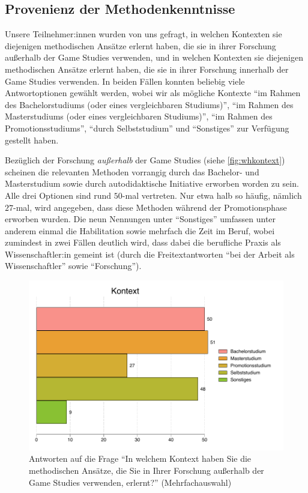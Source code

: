\documentclass{scrartcl}
\begin{document}
\subsection{Provenienz der Methodenkenntnisse}\label{sec:resultate_provenienz}
Unsere Teilnehmer:innen wurden von uns gefragt, in welchen Kontexten sie diejenigen methodischen Ansätze erlernt haben, die sie in ihrer Forschung außerhalb der Game Studies verwenden, und in welchen Kontexten sie diejenigen methodischen Ansätze erlernt haben, die sie in ihrer Forschung innerhalb der Game Studies verwenden.
In beiden Fällen konnten beliebig viele Antwortoptionen gewählt werden, wobei wir als mögliche Kontexte \enquote{im Rahmen des Bachelorstudiums (oder eines vergleichbaren Studiums)}, \enquote{im Rahmen des Masterstudiums (oder eines vergleichbaren Studiums)}, \enquote{im Rahmen des Promotionsstudiums}, \enquote{durch Selbststudium} und \enquote{Sonstiges} zur Verfügung gestellt haben.

Bezüglich der Forschung \textit{außerhalb} der Game Studies (siehe \autoref{fig:whkontext}) scheinen die relevanten Methoden vorrangig durch das Bachelor- und Masterstudium sowie durch autodidaktische Initiative erworben worden zu sein.
Alle drei Optionen sind rund $50$-mal vertreten.
Nur etwa halb so häufig, nämlich $27$-mal, wird angegeben, dass diese Methoden während der Promotionsphase erworben wurden.
Die neun Nennungen unter \enquote{Sonstiges} umfassen unter anderem einmal die Habilitation sowie mehrfach die Zeit im Beruf, wobei zumindest in zwei Fällen deutlich wird, dass dabei die berufliche Praxis als Wissenschaftler:in gemeint ist (durch die Freitextantworten \enquote{bei der Arbeit als Wissenschaftler} sowie \enquote{Forschung}).

\begin{figure}[t]
   \includegraphics[width=1\textwidth]{whkontext.pdf}
   \caption{Antworten auf die Frage \enquote{In welchem Kontext haben Sie die methodischen Ansätze, die Sie in Ihrer Forschung außerhalb der Game Studies verwenden, erlernt?} (Mehrfachauswahl)}
   \label{fig:whkontext}
\end{figure}
\end{document}
